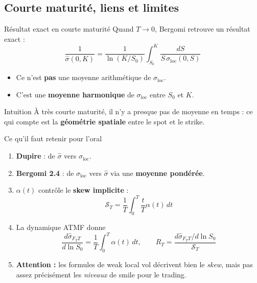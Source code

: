 \subsection{Courte maturité, liens et limites}

\begin{frame}{Résultat exact en courte maturité}
\small
Quand \(T\to 0\), Bergomi retrouve un résultat exact :
\[
\frac{1}{\hat{\sigma}(0,K)}
=
\frac{1}{\ln(K/S_0)}
\int_{S_0}^{K}\frac{dS}{S\,\sigma_{\mathrm{loc}}(0,S)}
\]

\begin{itemize}
    \item Ce n'est \textbf{pas} une moyenne arithmétique de \(\sigma_{\mathrm{loc}}\).
    \item C'est une \textbf{moyenne harmonique} de \(\sigma_{\mathrm{loc}}\) entre \(S_0\) et \(K\).
\end{itemize}

\begin{block}{Intuition}
À très courte maturité, il n'y a presque pas de moyenne en temps : ce qui compte est la \textbf{géométrie spatiale} entre le spot et le strike.
\end{block}
\end{frame}

\begin{frame}{Ce qu'il faut retenir pour l'oral}
\small
\begin{enumerate}
    \item \textbf{Dupire} : de \(\hat{\sigma}\) vers \(\sigma_{\mathrm{loc}}\).
    \item \textbf{Bergomi 2.4} : de \(\sigma_{\mathrm{loc}}\) vers \(\hat{\sigma}\) via une \textbf{moyenne pondérée}.
    \item \(\alpha(t)\) contrôle le \textbf{skew implicite} :
    \[
    \mathcal{S}_T=\frac{1}{T}\int_0^T \frac{t}{T}\alpha(t)\,dt
    \]
    \item La dynamique ATMF donne
    \[
    \frac{d\hat{\sigma}_{F_TT}}{d\ln S_0}=\frac{1}{T}\int_0^T \alpha(t)\,dt,
    \qquad
    R_T=\frac{d\hat{\sigma}_{F_TT}/d\ln S_0}{\mathcal{S}_T}
    \]
    \item \textbf{Attention :} les formules de weak local vol décrivent bien le \emph{skew}, mais pas assez précisément les \emph{niveaux} de smile pour le trading.
\end{enumerate}
\end{frame}
